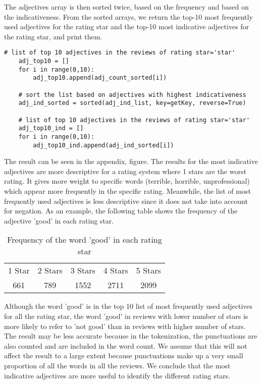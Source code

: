     
The adjectives array is then sorted twice, based on the frequency and based on the indicativeness. From the sorted arrays, we return the top-10 most frequently used adjectives for the rating star and the top-10 most indicative adjectives for the rating star, and print them. 

\begin{Verbatim}[fontsize=\tiny]
    # list of top 10 adjectives in the reviews of rating star='star'
    adj_top10 = []
    for i in range(0,10):
        adj_top10.append(adj_count_sorted[i])

    # sort the list based on adjectives with highest indicativeness
    adj_ind_sorted = sorted(adj_ind_list, key=getKey, reverse=True)

    # list of top 10 adjectives in the reviews of rating star='star'
    adj_top10_ind = []
    for i in range(0,10):
        adj_top10_ind.append(adj_ind_sorted[i])
\end{Verbatim}

The result can be seen in the appendix, figure. The results for the most indicative adjectives are more descriptive for a rating system where 1 stars are the worst rating. It gives more weight to specific words (terrible, horrible, unprofessional) which appear more frequently in the specific rating. Meanwhile, the list of most frequently used adjectives is less descriptive since it does not take into account for negation. As an example, the following table shows the frequency of the adjective 'good' in each rating star.

    \begin{center}
        \begin{table}[!h]
        \caption{Frequency of the word 'good' in each rating star}
            \begin{tabular}{c c c c c}
                1 Star & 2 Stars & 3 Stars & 4 Stars & 5 Stars\\
                661 & 789 & 1552 & 2711 & 2099\\
            \end{tabular}
        \end{table}
    \end{center}
    
Although the word 'good' is in the top 10 list of most frequently used adjectives for all the rating star, the word 'good' in reviews with lower number of stars is more likely to refer to 'not good' than in reviews with higher number of stars. The result may be less accurate because in the tokenization, the punctuations are also counted and are included in the word count. We assume that this will not affect the result to a large extent because punctuations make up a very small proportion of all the words in all the reviews. We conclude that the most indicative adjectives are more useful to identify the different rating stars.